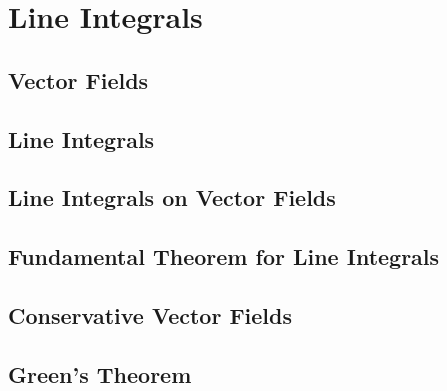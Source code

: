 \documentclass[../satmath.tex]{subfiles}
\begin{document}
\chapter{Line Integrals}
\section{Vector Fields}
\section{Line Integrals}
\section{Line Integrals on Vector Fields}
\section{Fundamental Theorem for Line Integrals}
\section{Conservative Vector Fields}
\section{Green's Theorem}
\end{document}
